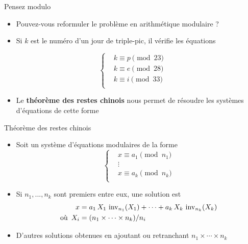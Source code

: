 \documentclass{main}
\begin{document}
\begin{frame}{Pensez modulo}
    \begin{itemize}
        \item Pouvez-vous reformuler le problème en arithmétique modulaire ?
        \pause
        \item Si $k$ est le numéro d’un jour de triple-pic, il vérifie les équations
    \end{itemize}
    \[\begin{cases}
        &k \equiv p \pmod{23}\\
        &k \equiv e \pmod{28}\\
        &k \equiv i \pmod{33}\\
    \end{cases}\]
    \vspace{-1em}
    \begin{itemize}
        \item Le \textbf{théorème des restes chinois} nous permet de résoudre les systèmes d’équations de cette forme
    \end{itemize}
\end{frame}

\begin{frame}{Théorème des restes chinois}
    \begin{itemize}
        \item Soit un système d’équations modulaires de la forme
        \[\begin{cases}
            &x \equiv a_1 \pmod{n_1}\\
            &\vdots\\
            &x \equiv a_k \pmod{n_k}\\
        \end{cases}\]
        \item Si $n_1, ..., n_k$ sont premiers entre eux, une solution est
        \begin{align*}
            x &=
                a_1\,X_1\,\operatorname{inv}_{n_1}(X_1) + \cdots
                + a_k\,X_k\,\operatorname{inv}_{n_k}(X_k)\\
            \text{où\enspace}X_i &= (n_1 \times \cdots \times n_k) / n_i
        \end{align*}
        \item D’autres solutions obtenues en ajoutant ou retranchant $n_1 \times \cdots \times n_k$
    \end{itemize}
    \vspace{-1em}
\end{frame}
\end{document}
